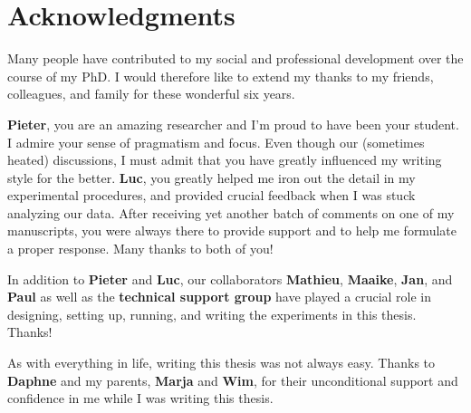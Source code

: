 \clearpage
\pagestyle{empty}

\chapter*{Acknowledgments}
{}

Many people have contributed to my social and professional development over the course of my PhD. I would therefore like to extend my thanks to my friends, colleagues, and family for these wonderful six years.

\textbf{Pieter}, you are an amazing researcher and I'm proud to have been your student. I admire your sense of pragmatism and focus. Even though our (sometimes heated) discussions, I must admit that you have greatly influenced my writing style for the better. \textbf{Luc}, you greatly helped me iron out the detail in my experimental procedures, and provided crucial feedback when I was stuck analyzing our data. After receiving yet another batch of comments on one of my manuscripts, you were always there to provide support and to help me formulate a proper response. Many thanks to both of you!

In addition to \textbf{Pieter} and \textbf{Luc}, our collaborators \textbf{Mathieu}, \textbf{Maaike}, \textbf{Jan}, and \textbf{Paul} as well as the \textbf{technical support group} have played a crucial role in designing, setting up, running, and writing the experiments in this thesis. Thanks!

As with everything in life, writing this thesis was not always easy. Thanks to \textbf{Daphne} and my parents, \textbf{Marja} and \textbf{Wim}, for their unconditional support and confidence in me while I was writing this thesis.
